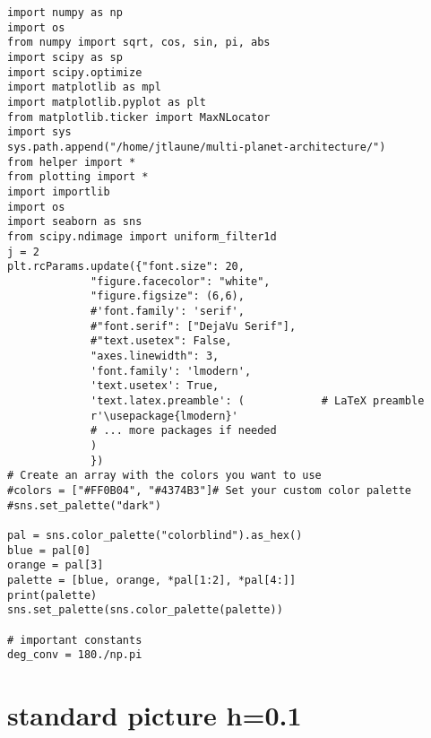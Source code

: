 \documentclass[11pt]{article}
\author{JT Laune}
\date{\today}
\title{}
\begin{document}
\tableofcontents

\begin{verbatim}
import numpy as np
import os
from numpy import sqrt, cos, sin, pi, abs
import scipy as sp
import scipy.optimize
import matplotlib as mpl
import matplotlib.pyplot as plt
from matplotlib.ticker import MaxNLocator
import sys
sys.path.append("/home/jtlaune/multi-planet-architecture/")
from helper import *
from plotting import *
import importlib
import os
import seaborn as sns
from scipy.ndimage import uniform_filter1d
j = 2
plt.rcParams.update({"font.size": 20,
		     "figure.facecolor": "white",
		     "figure.figsize": (6,6),
		     #'font.family': 'serif',
		     #"font.serif": ["DejaVu Serif"],
		     #"text.usetex": False,
		     "axes.linewidth": 3,
		     'font.family': 'lmodern',
		     'text.usetex': True,
		     'text.latex.preamble': (            # LaTeX preamble
			 r'\usepackage{lmodern}'
			 # ... more packages if needed
		     )
		     })
# Create an array with the colors you want to use
#colors = ["#FF0B04", "#4374B3"]# Set your custom color palette
#sns.set_palette("dark")

pal = sns.color_palette("colorblind").as_hex()
blue = pal[0]
orange = pal[3]
palette = [blue, orange, *pal[1:2], *pal[4:]]
print(palette)
sns.set_palette(sns.color_palette(palette))

# important constants
deg_conv = 180./np.pi
\end{verbatim}

\section{standard picture h=0.1}
\label{sec:orgdf9d36c}
\end{document}
